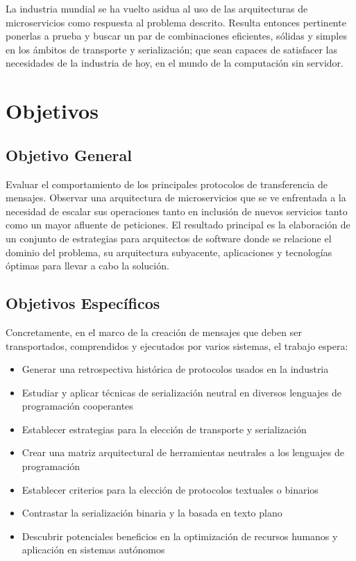 La industria mundial se ha vuelto asidua al uso de las arquitecturas de microservicios como respuesta al problema descrito. Resulta entonces pertinente ponerlas a prueba y buscar un par de combinaciones eficientes, sólidas y simples en los ámbitos de transporte y serialización; que sean capaces de satisfacer las necesidades de la industria de hoy, en el mundo de la computación sin servidor.

\section{Objetivos}

\subsection{Objetivo General}
Evaluar el comportamiento de los principales protocolos de transferencia de mensajes. Observar una arquitectura de microservicios que se ve enfrentada a la necesidad de escalar sus operaciones tanto en inclusión de nuevos servicios tanto como un mayor afluente de peticiones.
El resultado principal es la elaboración de un conjunto de estrategias para arquitectos de software donde se relacione el dominio del problema, su arquitectura subyacente, aplicaciones y tecnologías óptimas para llevar a cabo la solución.

\subsection{Objetivos Específicos}
Concretamente, en el marco de la creación de mensajes que deben ser transportados, comprendidos y ejecutados por varios sistemas, el trabajo espera:

\begin{itemize}
  \item Generar una retrospectiva histórica de protocolos usados en la industria
  \item Estudiar y aplicar técnicas de serialización neutral en diversos lenguajes de programación cooperantes
  \item Establecer estrategias para la elección de transporte y serialización
  \item Crear una matriz arquitectural de herramientas neutrales a los lenguajes de programación
  \item Establecer criterios para la elección de protocolos textuales o binarios
  \item Contrastar la serialización binaria y la basada en texto plano
  \item Descubrir potenciales beneficios en la optimización de recursos humanos y aplicación en sistemas autónomos
\end{itemize}

